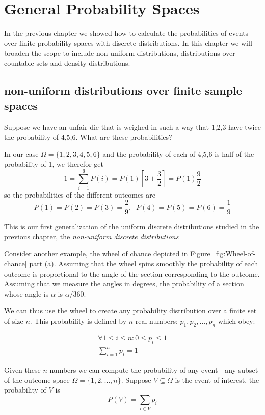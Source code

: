\chapter{General Probability Spaces}

In the previous chapter we showed how to calculate the probabilities
of events over finite probability spaces with discrete
distributions. In this chapter we will broaden the scope to include
non-uniform distributions, distributions over countable sets and
density distributions.

\section{non-uniform distributions over finite sample spaces}

Suppose we have an unfair die that is weighed in such a way that 1,2,3
have twice the probability of 4,5,6. What are these probabilities?

In our case $\Omega=\{1,2,3,4,5,6\}$ and the probability of each of
4,5,6 is half of the probability of 1, we therefor get
\[
1=\sum_{i=1}^6 P(i)=P(1)[3+\frac{3}{2}]=P(1)\frac{9}{2}
\]
so the probabilities of the different outcomes are 
\[ 
P(1)=P(2)=P(3)=\frac{2}{9},\;\; P(4)=P(5)=P(6)=\frac{1}{9}
\]

This is our first generalization of the uniform discrete
distributions studied in the previous chapter, the {\em non-uniform
  discrete distributions}

Consider another example, the wheel of chance depicted in
Figure~\ref{fig:Wheel-of-chance} part (a). Assuming that the wheel spins
smoothly the probability of each outcome is proportional to the angle
of the section corresponding to the outcome. Assuming that we measure
the angles in degrees, the probability of a section whose angle is
$\alpha$ is $\alpha/360$.

We can thus use the wheel to create any probability distribution over
a finite set of size $n$. This probability is defined by $n$ real numbers:
$p_1,p_2,\ldots,p_n$ which obey:

\begin{eqnarray}
\forall 1 \leq i \leq n: 0 \leq p_i \leq 1 \\
\sum_{i=1}^n p_i =1
\end{eqnarray}

Given these $n$ numbers we can compute the probability of any event -
any subset of the outcome space $\Omega=\{1,2,\ldots,n\}$. 
Suppose $V \subseteq \Omega$ is the event of interest, the probability
of $V$ is
\begin{equation}
P(V)=\sum_{i \in V} p_i
\end{equation}

